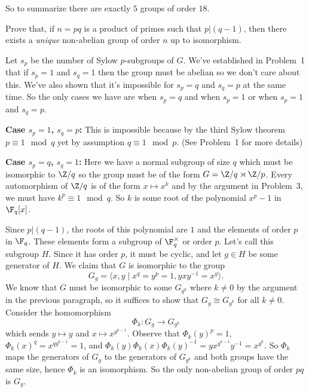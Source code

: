 \documentclass[11pt,letterpaper]{article}
\begin{document}
So to summarize there are exactly $5$ groups of order $18$.

\pagebreak
\begin{problem}
Prove that, if $n=pq$ is a product of primes such that $p|(q-1)$, then there exists a {\em unique} non-abelian group of order $n$ up to isomorphism.
\end{problem}

Let $s_p$ be the number of Sylow $p$-subgroups of $G$. We've established in Problem~1 that if $s_p=1$ and $s_q=1$ then the group must be abelian so we don't care about this. We've also shown that it's impossible for $s_p=q$ and $s_q=p$ at the same time. So the only cases we have are when $s_p=q$ and when $s_p=1$ or when $s_p=1$ and $s_q=p$.

\textbf{Case $s_p=1$, $s_q=p$:} This is impossible because by the third Sylow theorem $p\equiv 1\mod q$ yet by assumption $q\equiv 1\mod p$. (See Problem~1 for more details)

\textbf{Case $s_p=q$, $s_q=1$:} Here we have a normal subgroup of size $q$ which must be isomorphic to $\Z/q$ so the group must be of the form $G=\Z/q\rtimes \Z/p$. Every automorphism of $\Z/q$ is of the form $x\mapsto x^k$ and by the argument in Problem~3, we must have $k^p\equiv 1\mod q$. So $k$ is some root of the polynomial $x^p-1$ in $\F_q[x]$.

Since $p|(q-1)$, the roots of this polynomial are $1$ and the elements of order $p$ in $\F_q$. These elements form a subgroup of $\F_q^\times$ or order $p$. Let's call this subgroup $H$. Since it has order $p$, it must be cyclic, and let $g\in H$ be some generator of $H$. We claim that $G$ is isomorphic to the group
\[
    G_g = \big\langle x,y \mid x^q=y^p=1, yxy^{-1}=x^{g} \big\rangle
.\] 
We know that $G$ must be isomorphic to some $G_{g^k}$ where $k\neq 0$ by the argument in the previous paragraph, so it suffices to show that $G_{g}\cong G_{g^k}$ for all $k\neq 0$. Consider the homomorphism
\[
    \Phi_k : G_g \to G_{g^k}
\]     
which sends $y \mapsto y$ and $x\mapsto x^{g^{k-1}}$. Observe that $\Phi_k(y)^p=1$,  $\Phi_k(x)^q=x^{qg^{k-1}}=1$, and $\Phi_k(y)\Phi_k(x)\Phi_k(y)^{-1}=yx^{g^{k-1}}y^{-1}=x^{g^k}$. So $\Phi_k$ maps the generators of $G_g$ to the generators of $G_{g^{k}}$ and both groups have the same size, hence $\Phi_k$ is an isomorphism. So the only non-abelian group of order $pq$ is $G_g$.
\end{document}
